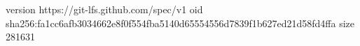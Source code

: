version https://git-lfs.github.com/spec/v1
oid sha256:fa1cc6afb3034662e8f0f554fba5140d65554556d7839f1b627ed21d58fd4ffa
size 281631
